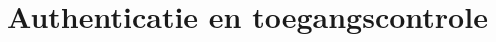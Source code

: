 \documentclass[../main.tex]{subfiles}
\begin{document}
\chapter{Authenticatie en toegangscontrole}
\end{document}
